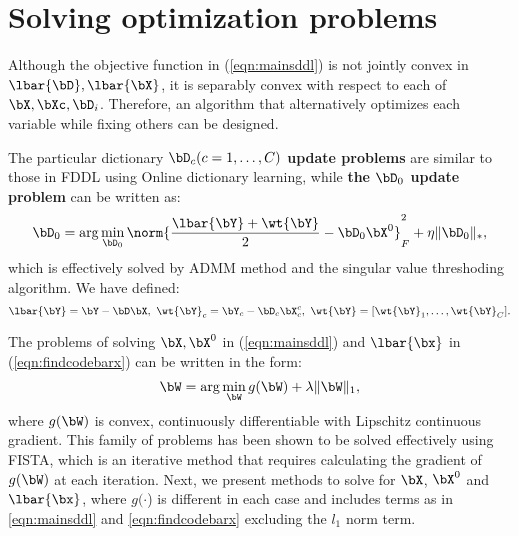 \documentclass[letterpaper]{article}
\begin{document}
\section{Solving optimization problems} %
\label{sub:solving_the_opt}
\par Although the objective function in (\ref{eqn:mainsddl}) is not jointly convex in $\lbar{\bD}, \lbar{\bX}$, it is separably convex with respect to each of $\bX, \bXc, \bD_i$. Therefore, an algorithm that alternatively optimizes each variable while fixing others can be designed. %
\par The particular dictionary {\bf $\bD_c (c = 1, \dots, C)$ update problems} are similar to those in FDDL\cite{Meng2011FDDL} using Online dictionary learning\cite{mairal2010online}, while {\bf the $\bD_0$ update problem} can be written as:
\begin{equation}
    \bD_0 = \arg\min_{\bD_0}  \norm{\frac{\lbar{\bY} + \wt{\bY}}{2} - \bD_0\bX^0}_F^2 + \eta\|\bD_0\|_*,
\end{equation}
which is effectively solved by ADMM\cite{boyd2011distributed} method and the singular value threshoding algorithm\cite{cai2010singular}. We have defined:
\begin{equation}
\label{eqn:defybarytilde}
 \lbar{\bY} = \bY - \bD\bX,~\wt{\bY}_c = \bY_c - \bD_c \bX_c^c,~\wt{\bY} = [\wt{\bY}_1, \dots, \wt{\bY}_C].
\end{equation}


\par The problems of solving $\bX, \bX^0$ in (\ref{eqn:mainsddl}) and $\lbar{\bx}$ in (\ref{eqn:findcodebarx}) can be written in the form:
\begin{equation}
\label{eqn:fista}
    \bW = \arg\min_{\bW} g(\bW) + \lambda\|\bW\|_1,
\end{equation}
where $g(\bW)$ is convex, continuously differentiable with Lipschitz continuous gradient. This family of problems has been shown to be solved effectively using FISTA\cite{beck2009fast}, which is an iterative method that requires calculating the gradient of $g(\bW)$ at each iteration. Next, we present methods to solve for $\bX$, $\bX^{0}$ and $\lbar{\bx}$, where $g(\cdot$) is different in each case and includes terms as in \eqref{eqn:mainsddl} and \eqref{eqn:findcodebarx} excluding the $l_1$ norm term.
\end{document}
